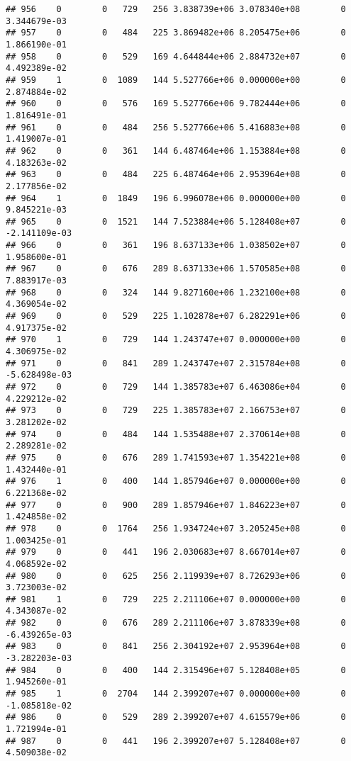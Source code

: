 \documentclass[
]{article}
\begin{document}
\begin{enumerate}
\begin{verbatim}
## 956    0        0   729   256 3.838739e+06 3.078340e+08        0  3.344679e-03
## 957    0        0   484   225 3.869482e+06 8.205475e+06        0  1.866190e-01
## 958    0        0   529   169 4.644844e+06 2.884732e+07        0  4.492389e-02
## 959    1        0  1089   144 5.527766e+06 0.000000e+00        0  2.874884e-02
## 960    0        0   576   169 5.527766e+06 9.782444e+06        0  1.816491e-01
## 961    0        0   484   256 5.527766e+06 5.416883e+08        0  1.419007e-01
## 962    0        0   361   144 6.487464e+06 1.153884e+08        0  4.183263e-02
## 963    0        0   484   225 6.487464e+06 2.953964e+08        0  2.177856e-02
## 964    1        0  1849   196 6.996078e+06 0.000000e+00        0  9.845221e-03
## 965    0        0  1521   144 7.523884e+06 5.128408e+07        0 -2.141109e-03
## 966    0        0   361   196 8.637133e+06 1.038502e+07        0  1.958600e-01
## 967    0        0   676   289 8.637133e+06 1.570585e+08        0  7.883917e-03
## 968    0        0   324   144 9.827160e+06 1.232100e+08        0  4.369054e-02
## 969    0        0   529   225 1.102878e+07 6.282291e+06        0  4.917375e-02
## 970    1        0   729   144 1.243747e+07 0.000000e+00        0  4.306975e-02
## 971    0        0   841   289 1.243747e+07 2.315784e+08        0 -5.628498e-03
## 972    0        0   729   144 1.385783e+07 6.463086e+04        0  4.229212e-02
## 973    0        0   729   225 1.385783e+07 2.166753e+07        0  3.281202e-02
## 974    0        0   484   144 1.535488e+07 2.370614e+08        0  2.289281e-02
## 975    0        0   676   289 1.741593e+07 1.354221e+08        0  1.432440e-01
## 976    1        0   400   144 1.857946e+07 0.000000e+00        0  6.221368e-02
## 977    0        0   900   289 1.857946e+07 1.846223e+07        0  1.424858e-02
## 978    0        0  1764   256 1.934724e+07 3.205245e+08        0  1.003425e-01
## 979    0        0   441   196 2.030683e+07 8.667014e+07        0  4.068592e-02
## 980    0        0   625   256 2.119939e+07 8.726293e+06        0  3.723003e-02
## 981    1        0   729   225 2.211106e+07 0.000000e+00        0  4.343087e-02
## 982    0        0   676   289 2.211106e+07 3.878339e+08        0 -6.439265e-03
## 983    0        0   841   256 2.304192e+07 2.953964e+08        0 -3.282203e-03
## 984    0        0   400   144 2.315496e+07 5.128408e+05        0  1.945260e-01
## 985    1        0  2704   144 2.399207e+07 0.000000e+00        0 -1.085818e-02
## 986    0        0   529   289 2.399207e+07 4.615579e+06        0  1.721994e-01
## 987    0        0   441   196 2.399207e+07 5.128408e+07        0  4.509038e-02

\end{verbatim}
\end{enumerate}
\end{document}
